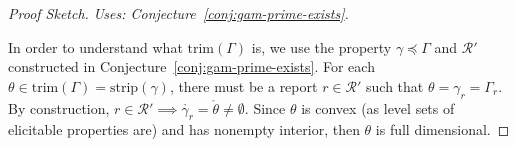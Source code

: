 \documentclass[12pt]{article}
\newcommand{\Comments}{1}
\newcommand{\mynote}[2]{\ifnum\Comments=1\textcolor{#1}{#2}\fi}
\newcommand{\jessie}[1]{\mynote{purple}{[JF: #1]}}
\newcommand{\R}{\mathcal{R}}
\newcommand{\inter}[1]{\mathring{#1}}%
\newcommand{\trim}{\mathrm{trim}}
\newcommand{\strip}{\mathrm{strip}}
\begin{document}
\begin{proof}[Proof Sketch]
	\emph{Uses: Conjecture~\ref{conj:gam-prime-exists}.}
	
	In order to understand what $\trim(\Gamma)$ is, we use the property $\gamma \preceq \Gamma$ and $\R'$ constructed in Conjecture~\ref{conj:gam-prime-exists}.
	For each $\theta \in \trim(\Gamma) = \strip(\gamma)$, there must be a report $r \in \R'$ such that $\theta = \gamma_r = \Gamma_{r}$.
	By construction, $r \in \R' \implies \inter{\gamma_r} = \inter{\theta} \neq \emptyset$.
	Since $\theta$ is convex (as level sets of elicitable properties are) and has nonempty interior, then $\theta$ is full dimensional. 
	
%	
%	
%	
%	
%	
%		
%		
%		
%		
%		

\end{proof}
\end{document}
